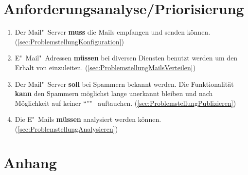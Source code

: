 \documentclass[a4paper,11pt,singlespacing]{article}
\begin{document}
\section{Anforderungsanalyse/Priorisierung}\label{sec:AnforderungsanalysePriorisierung}
	\begin{enumerate}
	\item Der Mail"~Server \textbf{muss} die Mails empfangen und senden können. (\autoref{sec:ProblemstellungKonfiguration})
	\item E"~Mail"~Adressen \textbf{müssen} bei diversen Diensten benutzt werden um den Erhalt von  einzuleiten. (\autoref{sec:ProblemstellungMailsVerteilen})
	\item Der Mail"~Server \textbf{soll} bei Spammern bekannt werden. Die  Funktionalität \textbf{kann} den Spammern möglichst lange unerkannt bleiben und nach Möglichkeit auf keiner "`"'"~ auftauchen. (\autoref{sec:ProblemstellungPublizieren})
	\item Die E"~Mails \textbf{müssen} analysiert werden können. (\autoref{sec:ProblemstellungAnalysieren})
	\end{enumerate}


%
%
%
%
%
%


\newpage




\listoffigures
{}

\lstlistoflistings
{}

\newpage

\section*{Anhang}\label{Anhang}

%
\end{document}
